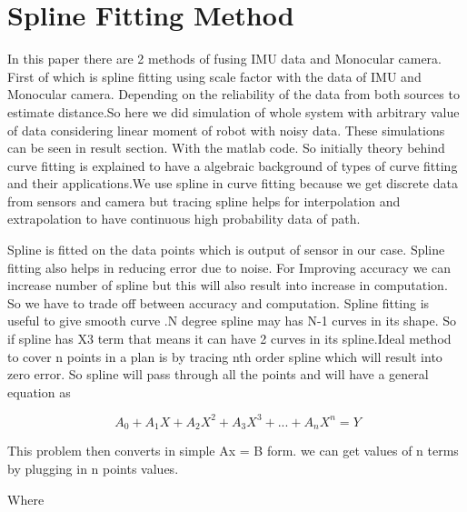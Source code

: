 \section{Spline Fitting Method}
\label{Spline_1}

In this paper there are 2 methods of fusing IMU data and Monocular camera. First of which is spline fitting using scale factor with the data of IMU and Monocular camera. Depending on the reliability of the data from both sources to estimate distance.So here we did simulation of whole system with arbitrary value of data considering linear moment of robot with noisy data. These simulations can be seen in result section. With the matlab code. So initially theory behind curve fitting is explained to have a algebraic background of types of curve fitting and their applications.We use spline in curve fitting because we get discrete data from sensors and camera but tracing spline helps for interpolation and extrapolation to have continuous high probability data of path.

Spline is fitted on the data points which is output of sensor in our case. Spline fitting also helps in reducing error due to noise. For Improving accuracy we can increase number of spline but this will also result into increase in computation. So we have to trade off between accuracy and computation.
Spline fitting is useful to give smooth curve .N degree spline may has N-1 curves in its shape. So if spline has X3 term that means it can have 2 curves in its spline.Ideal method to cover n points in a plan is by tracing nth order spline which will result into zero error. So spline will pass through all the points and will have a general equation as

\begin{equation}
\ A_{0} +A_{1}X +A_{2}X^{2}+A_{3}X^{3} + ... + A_{n}X^{n} = Y
\end{equation} 

This problem then converts in simple Ax = B form. we can get values of n terms by plugging in n points values.

Where

